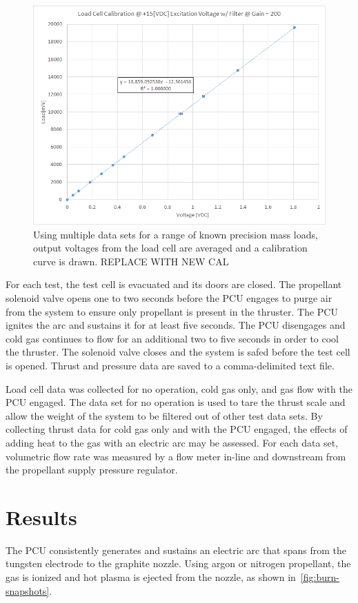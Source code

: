\documentclass[journal]{IEEEtran}
\begin{document}
\begin{figure}
  \includegraphics[width=\linewidth]{figs/loadcell-cal.png}
  \caption{Using multiple data sets for a range of known precision mass loads, output voltages from the load cell are averaged and a calibration curve is drawn. {\color{red} REPLACE WITH NEW CAL}}
\label{fig:loadcell-cal}
\end{figure}

For each test, the test cell is evacuated and its doors are closed.
The propellant solenoid valve opens one to two seconds before the PCU engages to purge air from the system to ensure only propellant is present in the thruster.
The PCU ignites the arc and sustains it for at least five seconds.
The PCU disengages and cold gas continues to flow for an additional two to five seconds in order to cool the thruster.
The solenoid valve closes and the system is safed before the test cell is opened.
Thrust and pressure data are saved to a comma-delimited text file.

Load cell data was collected for no operation, cold gas only, and gas flow with the PCU engaged.
The data set for no operation is used to tare the thrust scale and allow the weight of the system to be filtered out of other test data sets.
By collecting thrust data for cold gas only and with the PCU engaged, the effects of adding heat to the gas with an electric arc may be assessed.
For each data set, volumetric flow rate was measured by a flow meter in-line and downstream from the propellant supply pressure regulator.

\section{Results}
The PCU consistently generates and sustains an electric arc that spans from the tungsten electrode to the graphite nozzle.
Using argon or nitrogen propellant, the gas is ionized and hot plasma is ejected from the nozzle, as shown in~\autoref{fig:burn-snapshots}.
\end{document}
